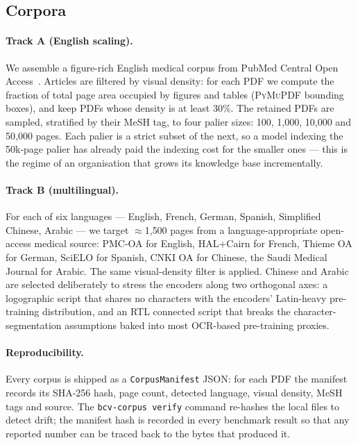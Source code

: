 \documentclass[10pt,a4paper]{article}
\begin{document}
\subsection{Corpora}
\label{sec:corpora}

\paragraph{Track A (English scaling).} We assemble a figure-rich English
medical corpus from PubMed Central Open Access~\cite{pmcoa}. Articles are
filtered by visual density: for each PDF we compute the fraction of total
page area occupied by figures and tables (\textsc{PyMuPDF} bounding boxes),
and keep PDFs whose density is at least 30\%. The retained PDFs are sampled,
stratified by their MeSH tag, to four palier sizes: 100, 1{,}000, 10{,}000
and 50{,}000 pages. Each palier is a strict subset of the next, so a model
indexing the 50k-page palier has already paid the indexing cost for the
smaller ones --- this is the regime of an organisation that grows its
knowledge base incrementally.

\paragraph{Track B (multilingual).} For each of six languages --- English,
French, German, Spanish, Simplified Chinese, Arabic --- we target
$\approx$1{,}500 pages from a language-appropriate open-access medical
source: PMC-OA for English, HAL+Cairn for French, Thieme OA for German,
SciELO for Spanish, CNKI OA for Chinese, the Saudi Medical Journal for
Arabic. The same visual-density filter is applied. Chinese and Arabic are
selected deliberately to stress the encoders along two orthogonal axes: a
logographic script that shares no characters with the encoders' Latin-heavy
pre-training distribution, and an RTL connected script that breaks the
character-segmentation assumptions baked into most OCR-based pre-training
proxies.

\paragraph{Reproducibility.} Every corpus is shipped as a
\texttt{CorpusManifest} JSON: for each PDF the manifest records its
SHA-256 hash, page count, detected language, visual density, MeSH tags and
source. The \texttt{bcv-corpus verify} command re-hashes the local files to
detect drift; the manifest hash is recorded in every benchmark result so
that any reported number can be traced back to the bytes that produced it.
\end{document}
